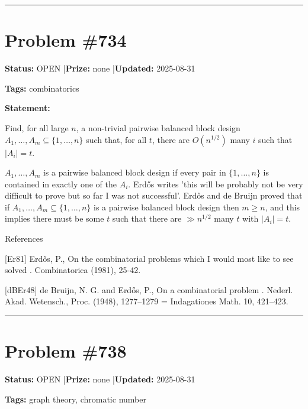 \documentclass{article}
\begin{document}
\noindent\rule{\linewidth}{0.4pt}


\section{Problem \#734}
\label{prob:734}

\noindent\textbf{Status:} OPEN \quad|\quad \textbf{Prize:} none \quad|\quad \textbf{Updated:} 2025-08-31

\noindent\textbf{Tags:} combinatorics

\medskip

\noindent\textbf{Statement:}

Find, for all large $n$, a non-trivial pairwise balanced block design $A_1,\ldots,A_m\subseteq \{1,\ldots,n\}$ such that, for all $t$, there are $O(n^{1/2})$ many $i$ such that $\lvert A_i\rvert=t$.




$A_1,\ldots,A_m$ is a pairwise balanced block design if every pair in $\{1,\ldots,n\}$ is contained in exactly one of the $A_i$. Erd\H{o}s \cite{Er81} writes 'this will be probably not be very difficult to prove but so far I was not successful'. Erd\H{o}s and de Bruijn \cite{dBEr48} proved that if $A_1,\ldots,A_m\subseteq \{1,\ldots,n\}$ is a pairwise balanced block design then $m\geq n$, and this implies there must be some $t$ such that there are $\gg n^{1/2}$ many $t$ with $\lvert A_i\rvert=t$.




References

[Er81] Erd\H{o}s, P., On the combinatorial problems which I would most like to see solved . Combinatorica (1981), 25-42.

[dBEr48] de Bruijn, N. G. and Erd\H{o}s, P., On a combinatorial problem . Nederl. Akad. Wetensch., Proc. (1948), 1277--1279 = Indagationes Math. 10, 421--423.

\noindent\rule{\linewidth}{0.4pt}


\section{Problem \#738}
\label{prob:738}

\noindent\textbf{Status:} OPEN \quad|\quad \textbf{Prize:} none \quad|\quad \textbf{Updated:} 2025-08-31

\noindent\textbf{Tags:} graph theory, chromatic number
\end{document}
